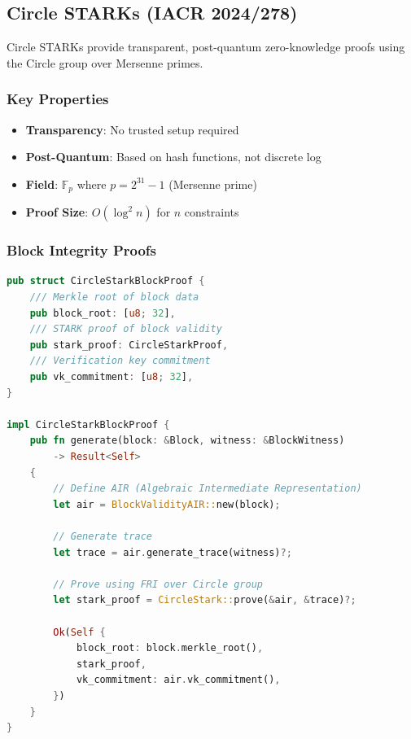 \documentclass[11pt,a4paper]{article}
\begin{document}
\subsection{Circle STARKs (IACR 2024/278)}

Circle STARKs provide transparent, post-quantum zero-knowledge proofs using the Circle group over Mersenne primes.

\subsubsection{Key Properties}

\begin{itemize}
    \item \textbf{Transparency}: No trusted setup required
    \item \textbf{Post-Quantum}: Based on hash functions, not discrete log
    \item \textbf{Field}: $\mathbb{F}_p$ where $p = 2^{31} - 1$ (Mersenne prime)
    \item \textbf{Proof Size}: $O(\log^2 n)$ for $n$ constraints
\end{itemize}

\subsubsection{Block Integrity Proofs}

\begin{lstlisting}[language=Rust, caption=Circle STARK Block Proof]
pub struct CircleStarkBlockProof {
    /// Merkle root of block data
    pub block_root: [u8; 32],
    /// STARK proof of block validity
    pub stark_proof: CircleStarkProof,
    /// Verification key commitment
    pub vk_commitment: [u8; 32],
}

impl CircleStarkBlockProof {
    pub fn generate(block: &Block, witness: &BlockWitness)
        -> Result<Self>
    {
        // Define AIR (Algebraic Intermediate Representation)
        let air = BlockValidityAIR::new(block);

        // Generate trace
        let trace = air.generate_trace(witness)?;

        // Prove using FRI over Circle group
        let stark_proof = CircleStark::prove(&air, &trace)?;

        Ok(Self {
            block_root: block.merkle_root(),
            stark_proof,
            vk_commitment: air.vk_commitment(),
        })
    }
}
\end{lstlisting}
\end{document}
